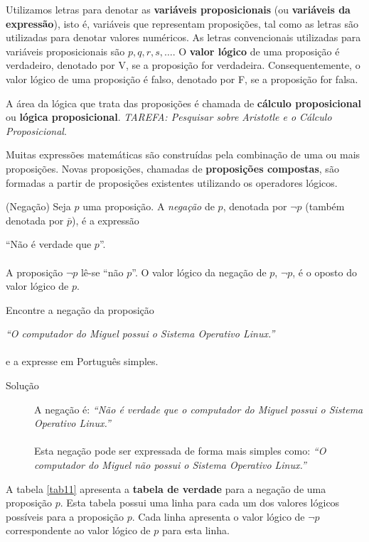 Utilizamos letras para denotar as \textbf{variáveis proposicionais} (ou
\textbf{variáveis da expressão}), isto é, variáveis que representam proposições,
tal como as letras são utilizadas para denotar valores numéricos. As letras
convencionais utilizadas para variáveis proposicionais são $p, q, r, s, \ldots$.
O \textbf{valor lógico} de uma proposição é verdadeiro, denotado por V, se a
proposição for verdadeira. Consequentemente, o valor lógico de uma
proposição é falso, denotado por F, se a proposição for falsa.

A área da lógica que trata das proposições é chamada de \textbf{cálculo
proposicional} ou \textbf{lógica proposicional}. \emph{TAREFA: Pesquisar sobre
Aristotle e o Cálculo Proposicional}.

Muitas expressões matemáticas são construídas pela combinação de uma ou mais
proposições. Novas proposições, chamadas de \textbf{proposições compostas}, são
formadas a partir de proposições existentes utilizando os operadores lógicos.

\begin{defn}\label{def11}(Negação) Seja $p$ uma proposição. A
\emph{negação} de $p$, denotada por $\lnot p$ (também denotada por $\bar{p}$),
é a expressão\end{defn}

``Não é verdade que $p$''.\\ \\
A proposição $\lnot p$ lê-se ``não $p$''. O valor lógico da negação de $p$,
$\lnot p$, é o oposto do valor lógico de $p$.

\label{exem13}
\begin{exmp}Encontre a negação da proposição\end{exmp}
\emph{``O computador do Miguel possui o Sistema Operativo Linux.''}\\ \\
e a expresse em Português simples.

\begin{description}
\item[Solução] A negação é: \emph{``Não é verdade que o computador do Miguel
possui o Sistema Operativo Linux.''}\\ \\
Esta negação pode ser expressada de forma mais simples como: \emph{``O
computador do Miguel não possui o Sistema Operativo Linux.''}
\end{description}


A tabela \ref{tab11} apresenta a \textbf{tabela de verdade} para a negação
de uma proposição $p$. Esta tabela possui uma linha para cada um dos valores
lógicos possíveis para a proposição $p$. Cada linha apresenta o valor lógico de
$\lnot p$ correspondente ao valor lógico de $p$ para esta linha.

